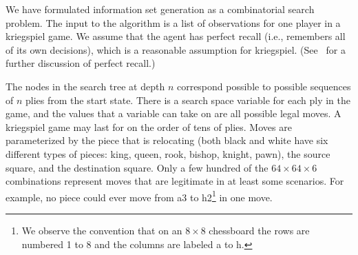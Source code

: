 \documentclass[times, 10pt,twocolumn]{article}
\begin{document}

   
We have formulated information set generation as a combinatorial search problem.  The input to the algorithm is a list
of observations for one player in a kriegspiel game.  We assume that the agent has perfect recall (i.e., remembers all
of its own decisions), which is a reasonable assumption for kriegspiel.  (See~\cite{gilpin07algorithms} for a further
discussion of perfect recall.)  

The nodes in the search tree at depth $n$ correspond possible to possible sequences of $n$ plies from the start state.
There is a search space variable for each ply in the game, and the values that a variable can take on are all possible
legal moves.  A kriegspiel game may last for on the order of tens of plies.  Moves are parameterized by the piece that
is relocating (both black and white have six different types of pieces: king, queen, rook, bishop, knight, pawn), the
source square, and the destination square.  Only a few hundred of the $64 \times 64 \times 6$ combinations represent
moves that are legitimate in at least some scenarios.  For example, no piece could ever move from a3 to h2\footnote{We
observe the convention that on an $8 \times 8$ chessboard the rows are numbered 1 to 8 and the columns are labeled a to
h.} in one move.
\end{document}

